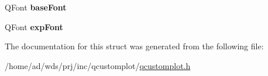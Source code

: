 \begin{DoxyCompactItemize}
\item 
Q\+Font {\bfseries base\+Font}\hypertarget{struct_q_c_p_axis_painter_private_1_1_tick_label_data_a0d4958a706debaa8d19a9b65fc090d56}{}\label{struct_q_c_p_axis_painter_private_1_1_tick_label_data_a0d4958a706debaa8d19a9b65fc090d56}

\item 
Q\+Font {\bfseries exp\+Font}\hypertarget{struct_q_c_p_axis_painter_private_1_1_tick_label_data_adc10767ebcb719d6927c012a38b9d933}{}\label{struct_q_c_p_axis_painter_private_1_1_tick_label_data_adc10767ebcb719d6927c012a38b9d933}

\end{DoxyCompactItemize}


The documentation for this struct was generated from the following file\+:\begin{DoxyCompactItemize}
\item 
/home/ad/wds/prj/inc/qcustomplot/\hyperlink{qcustomplot_8h}{qcustomplot.\+h}\end{DoxyCompactItemize}

